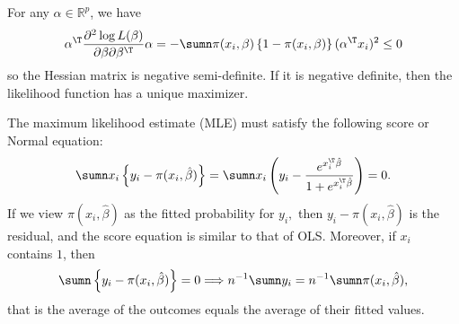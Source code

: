 For any $\alpha \in \mathbb{R}^p$, we have
$$
\alpha^{\T}  \frac{\partial^{2}\log L(\beta)}{\partial\beta\partial\beta^{\T}} \alpha
=-\sumn\pi(x_{i},\beta)\left\{ 1-\pi(x_{i},\beta)\right\} (\alpha^{\T} x_{i} )^2 \leq 0
$$
so the Hessian matrix is negative semi-definite.
If it is negative
definite, then the likelihood function has a unique maximizer. 

The maximum likelihood estimate (MLE) must satisfy the following score or Normal equation:
\[
\sumn x_{i}\left\{ y_{i}-\pi(x_{i},\hat{\beta})\right\} =\sumn x_{i}\left(y_{i}-\frac{e^{x_{i}^{\T}\hat{\beta}}}{1+e^{x_{i}^{\T}\hat{\beta}}}\right)=0.
\]
If we view $\pi(x_{i},\hat{\beta})$ as the fitted probability
for $y_{i},$ then $y_{i}-\pi(x_{i},\hat{\beta})$ is the residual,
and the score equation is similar to that of OLS. Moreover, if $x_{i}$
contains $1$, then 
\[
\sumn\left\{ y_{i}-\pi(x_{i},\hat{\beta})\right\} =0 \Longrightarrow n^{-1}\sumn y_{i}=n^{-1}\sumn\pi(x_{i},\hat{\beta}),
\]
 that is the average of the outcomes equals the average of their fitted
values. 

